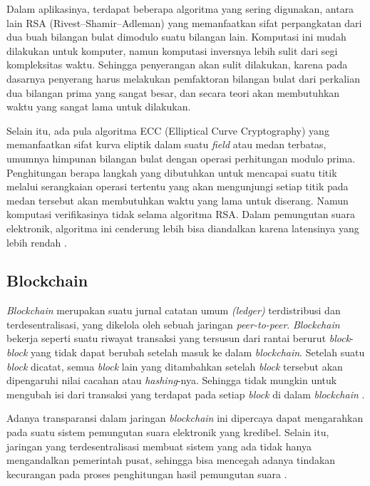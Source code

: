 Dalam aplikasinya, terdapat beberapa algoritma yang sering digunakan, antara lain RSA (Rivest–Shamir–Adleman) yang memanfaatkan sifat perpangkatan dari dua buah bilangan bulat dimodulo suatu bilangan lain. Komputasi ini mudah dilakukan untuk komputer, namun komputasi inversnya lebih sulit dari segi kompleksitas waktu. Sehingga penyerangan akan sulit dilakukan, karena pada dasarnya penyerang harus melakukan pemfaktoran bilangan bulat dari perkalian dua bilangan prima yang sangat besar, dan secara teori akan membutuhkan waktu yang sangat lama untuk dilakukan.

Selain itu, ada pula algoritma ECC (Elliptical Curve Cryptography) yang memanfaatkan sifat kurva eliptik dalam suatu \textit{field} atau medan terbatas, umumnya himpunan bilangan bulat dengan operasi perhitungan modulo prima. Penghitungan berapa langkah yang dibutuhkan untuk mencapai suatu titik melalui serangkaian operasi tertentu yang akan mengunjungi setiap titik pada medan tersebut akan membutuhkan waktu yang lama untuk diserang. Namun komputasi verifikasinya tidak selama algoritma RSA. Dalam pemungutan suara elektronik, algoritma ini cenderung lebih bisa diandalkan karena latensinya yang lebih rendah \citep{mahto2017rsa}.

\subsection{Blockchain}

\textit{Blockchain} merupakan suatu jurnal catatan umum \textit{(ledger)} terdistribusi dan terdesentralisasi, yang dikelola oleh sebuah jaringan \textit{peer-to-peer}. \textit{Blockchain} bekerja seperti suatu riwayat transaksi yang tersusun dari rantai berurut \textit{block}-\textit{block} yang tidak dapat berubah setelah masuk ke dalam \textit{blockchain}. Setelah suatu \textit{block} dicatat, semua \textit{block} lain yang ditambahkan setelah \textit{block} tersebut akan dipengaruhi nilai cacahan atau \textit{hashing}-nya. Sehingga tidak mungkin untuk mengubah isi dari transaksi yang terdapat pada setiap \textit{block} di dalam \textit{blockchain} \citep{koreanevoting}.

Adanya transparansi dalam jaringan \textit{blockchain} ini dipercaya dapat mengarahkan pada suatu sistem pemungutan suara elektronik yang kredibel. Selain itu, jaringan yang terdesentralisasi membuat sistem yang ada tidak hanya mengandalkan pemerintah pusat, sehingga bisa mencegah adanya tindakan kecurangan pada proses penghitungan hasil pemungutan suara \citep{blockchain}.

